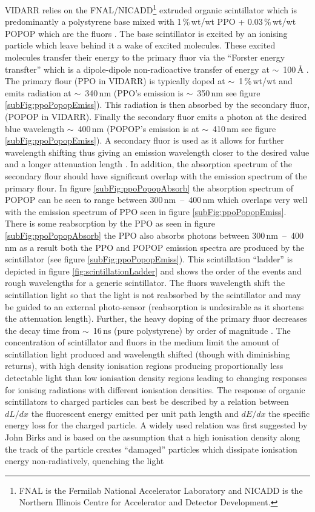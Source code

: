 VIDARR relies on the FNAL/NICADD\footnote{FNAL is the Fermilab National Accelerator Laboratory and NICADD is the Northern Illinois Centre for Accelerator and Detector Development.} extruded organic scintillator which is predominantly a polystyrene base mixed with 1\,\%\,wt/wt PPO + 0.03\,\%\,wt/wt POPOP which are the fluors \cite{pla2003extruding}. The base scintillator is excited by an ionising particle which leave behind it a wake of excited molecules. These excited molecules transfer their energy to the primary fluor via the ``Forster energy transfter'' which is a dipole-dipole non-radioactive transfer of energy at $\sim$~100\,{\AA} \cite{Zyla_pdg_2020}. The primary flour (PPO in VIDARR) is typically doped at $\sim$~1\,\%\,wt/wt and emits radiation at $\sim$~340\,nm (PPO's emission is $\sim$~350\,nm see figure \ref{subFig:ppoPopopEmiss}). This radiation is then absorbed by the secondary fluor, (POPOP in VIDARR). Finally the secondary fluor emits a photon at the desired blue wavelength $\sim$~400\,nm (POPOP's emission is at $\sim$~410\,nm see figure \ref{subFig:ppoPopopEmiss}). A secondary fluor is used as it allows for further wavelength shifting thus giving an emission wavelength closer to the desired value and a longer attenuation length \cite{Zyla_pdg_2020}. In addition, the absorption spectrum of the secondary flour should have significant overlap with the emission spectrum of the primary flour. In figure \ref{subFig:ppoPopopAbsorb} the absorption spectrum of POPOP can be seen to range between 300\,nm~--~400\,nm which overlaps very well with the emission spectrum of PPO seen in figure \ref{subFig:ppoPopopEmiss}. There is some reabsorption by the PPO as seen in figure \ref{subFig:ppoPopopAbsorb} the PPO also absorbs photons between 300\,nm~--~400\,nm as a result both the PPO and POPOP emission spectra are produced by the scintillator (see figure \ref{subFig:ppoPopopEmiss}). This scintillation ``ladder'' is depicted in figure \ref{fig:scintillationLadder} and shows the order of the events and rough wavelengths for a generic scintillator. The fluors wavelength shift the scintillation light so that the light is not reabsorbed by the scintillator and may be guided to an external photo-sensor (reabsorption is undesirable as it shortens the attenuation length). Further, the heavy doping of the primary fluor decreases the decay time from $\sim$~16\,ns (pure polystyrene) by order of magnitude \cite{Zyla_pdg_2020}. The concentration of scintillator and fluors in the medium limit the amount of scintillation light produced and wavelength shifted (though with diminishing returns), with high density ionisation regions producing proportionally less detectable light than low ionisation density regions leading to changing responses for ionising radiations with different ionisation densities. The response of organic scintillators to charged particles can best be described by a relation between $dL/dx$ the fluorescent energy emitted per unit path length and $dE/dx$ the specific energy loss for the charged particle. A widely used relation was first suggested by John Birks \cite{birks_1964} and is based on the assumption that a high ionisation density along the track of the particle creates ``damaged'' particles which dissipate ionisation energy non-radiatively, quenching the light 